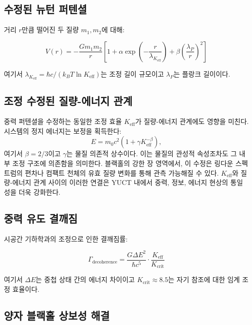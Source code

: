 \documentclass[11pt,a4paper]{article}
\theoremstyle{remark}
\newcommand{\Keff}{K_{\mathrm{eff}}}
\begin{document}
	\subsection{수정된 뉴턴 퍼텐셜}
	
	거리 $r$만큼 떨어진 두 질량 $m_1, m_2$에 대해:
	
	\begin{equation}
		V(r) = -\frac{G m_1 m_2}{r} \left[ 1 + \alpha \exp\left(-\frac{r}{\lambda_{\Keff}}\right) + \beta \left(\frac{\lambda_P}{r}\right)^2 \right]
	\end{equation}
	
	여기서 $\lambda_{\Keff} = \hbar c / (k_B T \ln \Keff)$는 조정 길이 규모이고 $\lambda_P$는 플랑크 길이이다.
	
	\subsection{조정 수정된 질량-에너지 관계}
	\label{subsec:coord-emc2-G}
	
	중력 퍼텐셜을 수정하는 동일한 조정 효율 $\Keff$가 질량-에너지 관계에도 영향을 미친다. 시스템의 정지 에너지는 보정을 획득한다:
	\[
	E = m_{0} c^{2} \left(1 + \gamma K_{\mathrm{eff}}^{-\beta}\right),
	\]
	여기서 $\beta = 2/3$이고 $\gamma$는 물질 의존적 상수이다. 이는 물질의 관성적 속성조차도 그 내부 조정 구조에 의존함을 의미한다. 블랙홀의 강한 장 영역에서, 이 수정은 링다운 스펙트럼의 편차나 컴팩트 천체의 유효 질량 변화를 통해 관측 가능해질 수 있다. $\Keff$와 질량-에너지 관계 사이의 이러한 연결은 YUCT 내에서 중력, 정보, 에너지 현상의 통일성을 더욱 강화한다.
	
	\subsection{중력 유도 결깨짐}
	
	시공간 기하학과의 조정으로 인한 결깨짐률:
	
	\begin{equation}
		\Gamma_{\text{decoherence}} = \frac{G \Delta E^2}{\hbar c^5} \cdot \frac{\Keff}{K_{\text{crit}}}
	\end{equation}
	
	여기서 $\Delta E$는 중첩 상태 간의 에너지 차이이고 $K_{\text{crit}} \approx 8.5$는 자기 참조에 대한 임계 조정 효율이다.
	
	\subsection{양자 블랙홀 상보성 해결}
	
\end{document}
